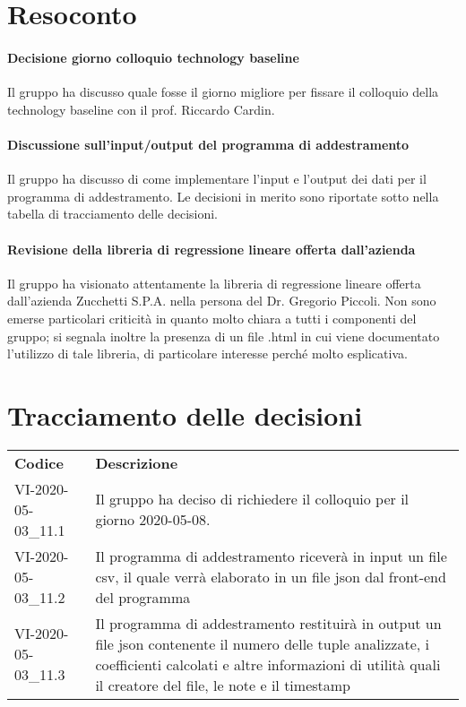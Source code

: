 \documentclass{article}
\begin{document}
\section{Resoconto}%
\label{resoconto}
\paragraph*{Decisione giorno colloquio technology baseline}
Il gruppo ha discusso quale fosse il giorno migliore per fissare il colloquio della technology baseline con il prof. Riccardo Cardin.

\paragraph*{Discussione sull'input/output del programma di addestramento}
Il gruppo ha discusso di come implementare l'input e l'output dei dati per il programma di addestramento. Le decisioni in merito sono riportate sotto nella tabella di tracciamento delle decisioni.

\paragraph*{Revisione della libreria di regressione lineare offerta dall'azienda}
Il gruppo ha visionato attentamente la libreria di regressione lineare offerta dall'azienda Zucchetti S.P.A. nella persona del Dr. Gregorio Piccoli. Non sono emerse particolari criticità in quanto molto chiara a tutti i componenti del gruppo; si segnala inoltre la presenza di un file .html in cui viene documentato l'utilizzo di tale libreria, di particolare interesse perché molto esplicativa.

\section{Tracciamento delle decisioni}
\begin{table}[H]
  \centering
  \begin{tabular}{p{4cm}|p{12cm}}
    \rowcolor{lightgray}
    \textbf{Codice}  & \textbf{Descrizione}      \\
    VI-2020-05-03\_11.1 & Il gruppo ha deciso di richiedere il colloquio per il giorno 2020-05-08. \\
     VI-2020-05-03\_11.2 & Il programma di addestramento riceverà in input un file csv, il quale verrà elaborato in un file json dal front-end del programma \\
     VI-2020-05-03\_11.3 & Il programma di addestramento restituirà in output un file json contenente il numero delle tuple analizzate, i coefficienti calcolati e altre informazioni di utilità quali il creatore del file, le note e il timestamp\\
  \end{tabular}
\end{table}
\end{document}
